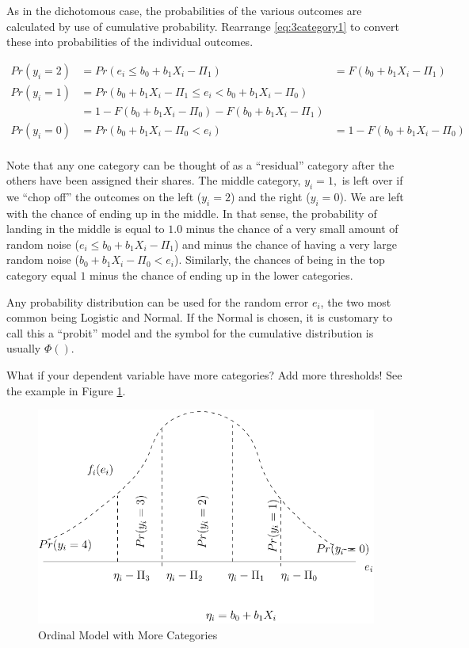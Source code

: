 As in the dichotomous case, the probabilities of the various outcomes
are calculated by use of cumulative probability. Rearrange \ref{eq:3category1}
to convert these into probabilities of the individual outcomes.

\begin{equation}
\begin{array}{lll}
Pr(y_{i}=2) & =Pr(e_{i}\leq b_{0}+b_{1}X_{i}-\Pi_{1}) & =F(b_{0}+b_{1}X_{i}-\Pi_{1})\\
Pr(y_{i}=1) & =Pr(b_{0}+b_{1}X_{i}-\Pi_{1}\leq e_{i}<b_{0}+b_{1}X_{i}-\Pi_{0})\\
 & =1-F(b_{0}+b_{1}X_{i}-\Pi_{0})-F(b_{0}+b_{1}X_{i}-\Pi_{1})\\
Pr(y_{i}=0) & =Pr(b_{0}+b_{1}X_{i}-\Pi_{0}<e_{i}) & =1-F(b_{0}+b_{1}X_{i}-\Pi_{0})
\end{array}\label{eq:3category2}
\end{equation}
\\
Note that any one category can be thought of as a ``residual'' category
after the others have been assigned their shares. The middle category,
$y_{i}=1,$ is left over if we ``chop off'' the outcomes on the
left ($y_{i}=2$) and the right ($y_{i}=0$). We are left with the
chance of ending up in the middle. In that sense, the probability
of landing in the middle is equal to $1.0$ minus the chance of a
very small amount of random noise ($e_{i}\leq b_{0}+b_{1}X_{i}-\Pi_{1}$)
and minus the chance of having a very large random noise ($b_{0}+b_{1}X_{i}-\Pi_{0}<e_{i}$).
Similarly, the chances of being in the top category equal $1$ minus
the chance of ending up in the lower categories.

Any probability distribution can be used for the random error $e_{i}$,
the two most common being Logistic and Normal. If the Normal is chosen,
it is customary to call this a ``probit'' model and the symbol for
the cumulative distribution is usually $\Phi()$.

What if your dependent variable have more categories? Add more thresholds!
See the example in Figure \ref{fig:Ordinal-5cat}.

\begin{figure}
\begin{centering}

\par\end{centering}

\begin{centering}
\includegraphics{Chapter1/ordinal-fig-3}
\par\end{centering}

\caption{Ordinal Model with More Categories\label{fig:Ordinal-5cat}}
\end{figure}

